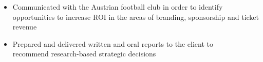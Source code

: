 \documentclass[9pt,a4paper,ragged2e]{altacv}
\begin{document}
    \divider

    \begin{itemize}
        \item Communicated with the Austrian football club in order to identify opportunities to increase ROI in the areas of branding, sponsorship and ticket revenue
        \item Prepared and delivered written and oral reports to the client to \\ recommend research-based strategic decisions
    \end{itemize}



    \bigskip\bigskip\bigskip


    \clearpage
\end{document}
